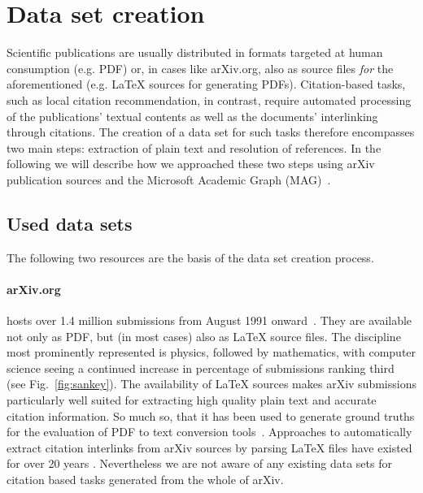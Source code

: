 
\section{Data set creation}\label{sec:data-set-creation}
Scientific publications are usually distributed in formats targeted at human consumption (e.g. PDF) or, in cases like arXiv.org, also as source files \emph{for} the aforementioned (e.g. \LaTeX{} sources for generating PDFs). Citation-based tasks, such as local citation recommendation, in contrast, require automated processing of the publications' textual contents as well as the documents' interlinking through citations. The creation of a data set for such tasks therefore encompasses two main steps: extraction of plain text and resolution of references. In the following we will describe how we approached these two steps using arXiv publication sources and the Microsoft Academic Graph (MAG)~\cite{Sinha2015}.

\subsection{Used data sets}

The following two resources are the basis of the data set creation process.

\paragraph{arXiv.org} hosts over 1.4 million submissions from August 1991 onward~\cite{Ginsparg1994}. They are available not only as PDF, but (in most cases) also as \LaTeX{} source files. The discipline most prominently represented is physics, followed by mathematics, with computer science seeing a continued increase in percentage of submissions ranking third (see Fig.~\ref{fig:sankey}). The availability of \LaTeX{} sources makes arXiv submissions particularly well suited for extracting high quality plain text and accurate citation information. So much so, that it has been used to generate ground truths for the evaluation of PDF to text conversion tools~\cite{Bast2017}. Approaches to automatically extract citation interlinks from arXiv sources by parsing \LaTeX{} files have existed for over 20 years \cite{Nanba1998}. Nevertheless we are not aware of any existing data sets for citation based tasks generated from the whole of arXiv.

